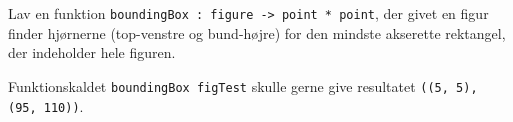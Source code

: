 Lav en funktion \lstinline{boundingBox : figure -> point * point}, der
givet en figur finder hjørnerne (top-venstre og bund-højre) for den
mindste akserette rektangel, der indeholder hele figuren.

Funktionskaldet \lstinline{boundingBox figTest} skulle gerne give
resultatet \lstinline{((5, 5), (95, 110))}.
